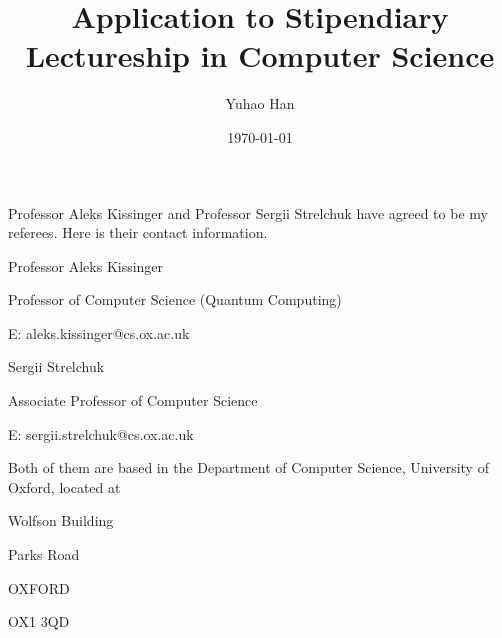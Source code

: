 \documentclass{letter}
\title{Application to Stipendiary Lectureship in Computer Science}
\author{Yuhao Han}
\date{\today}
\begin{document}

Professor Aleks Kissinger and Professor Sergii Strelchuk have agreed to be my referees. 
Here is their contact information.

Professor Aleks Kissinger

Professor of Computer Science (Quantum Computing)

E: aleks.kissinger@cs.ox.ac.uk

\vspace{1cm}

Sergii Strelchuk

Associate Professor of Computer Science

E: sergii.strelchuk@cs.ox.ac.uk 

\vspace{1cm}

Both of them are based in the Department of Computer Science, University of Oxford, located at

Wolfson Building

Parks Road

OXFORD

OX1 3QD
\end{document}
